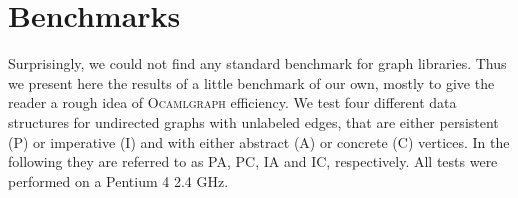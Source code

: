 \documentclass[]{tfp05symp}
\newcommand{\ocamlgraph}{\textsc{Ocamlgraph}\xspace}
\begin{document}

\section{Benchmarks}\label{bench}

Surprisingly, we could not find any standard benchmark for graph
libraries. Thus we present here the results of a little benchmark of
our own, mostly to give the reader a rough idea of \ocamlgraph efficiency.
We test four different data structures for undirected
graphs with unlabeled edges, that are either persistent (P) or
imperative (I) and with either abstract (A) or concrete (C) vertices. In
the following they are referred to as PA, PC, IA and IC, respectively.
All tests were performed on a Pentium 4 2.4 GHz.
\end{document}
